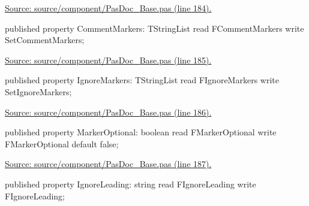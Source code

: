 \documentclass{report}
\newif\ifpdf
\begin{document}
\begin{list}{}
\begin{flushleft}
\ifpdf
\end{flushleft}
\fi


\par  \par
\href{https://github.com/pasdoc/pasdoc/blob/master/source/component/PasDoc_Base.pas#L184}{Source: source/component/PasDoc{\_}Base.pas (line 184).}\label{PasDoc_Base.TPasDoc-CommentMarkers}
\item[\textbf{CommentMarkers}\hfill]
\ifpdf
\begin{flushleft}
\fi
\begin{ttfamily}
published property CommentMarkers: TStringList read FCommentMarkers write SetCommentMarkers;\end{ttfamily}

\ifpdf
\end{flushleft}
\fi


\par  \par
\href{https://github.com/pasdoc/pasdoc/blob/master/source/component/PasDoc_Base.pas#L185}{Source: source/component/PasDoc{\_}Base.pas (line 185).}\label{PasDoc_Base.TPasDoc-IgnoreMarkers}
\item[\textbf{IgnoreMarkers}\hfill]
\ifpdf
\begin{flushleft}
\fi
\begin{ttfamily}
published property IgnoreMarkers: TStringList read FIgnoreMarkers write SetIgnoreMarkers;\end{ttfamily}

\ifpdf
\end{flushleft}
\fi


\par  \par
\href{https://github.com/pasdoc/pasdoc/blob/master/source/component/PasDoc_Base.pas#L186}{Source: source/component/PasDoc{\_}Base.pas (line 186).}\label{PasDoc_Base.TPasDoc-MarkerOptional}
\item[\textbf{MarkerOptional}\hfill]
\ifpdf
\begin{flushleft}
\fi
\begin{ttfamily}
published property MarkerOptional: boolean read FMarkerOptional write FMarkerOptional
      default false;\end{ttfamily}

\ifpdf
\end{flushleft}
\fi


\par  \par
\href{https://github.com/pasdoc/pasdoc/blob/master/source/component/PasDoc_Base.pas#L187}{Source: source/component/PasDoc{\_}Base.pas (line 187).}\label{PasDoc_Base.TPasDoc-IgnoreLeading}
\item[\textbf{IgnoreLeading}\hfill]
\ifpdf
\begin{flushleft}
\fi
\begin{ttfamily}
published property IgnoreLeading: string read FIgnoreLeading write FIgnoreLeading;\end{ttfamily}


\end{flushleft}
\end{list}
\end{document}

